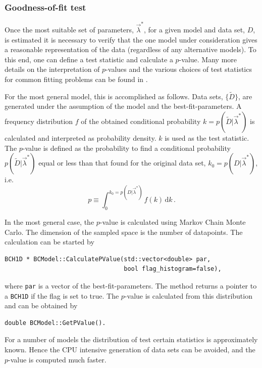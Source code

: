 \documentclass[11pt, a4paper]{article}
\begin{document}
\subsubsection{Goodness-of-fit test}

Once the most suitable set of parameters, $\vec{\lambda}^{*}$, for a
given model and data set, $D$, is estimated it is necessary
to verify that the one  model under consideration
gives a reasonable representation of the data
(regardless of any alternative models). To this end, one can
define a test statistic and calculate a $p$-value. Many more
details on the interpretation of $p$-values and the various
choices of test statistics for common fitting problems can be found
in \cite{BAT_pValue}.

For the most general model, this is accomplished as follows.
Data sets, $\{ \tilde{D} \}$, are generated under the
assumption of the model and the best-fit-parameters. A frequency
distribution $f$ of the obtained conditional probability
$k=p(\tilde{D}|\vec{\lambda}^{*})$ is calculated and interpreted as
probability density. $k$ is used as the test statistic.
The $p$-value is defined as the probability to
find a conditional probability $p(\tilde{D}|\vec{\lambda}^{*})$ equal
or less than that found for the original data set,
$k_{0}=p(D|\vec{\lambda}^{*})$, i.e.
%
\begin{equation}
p \equiv  \int_{0}^{k_{0}=p(D|\vec{\lambda}^{*})} f(k) \, \mathrm{d}k \, .
\end{equation}

In the most general case, the $p$-value is calculated using Markov
Chain Monte Carlo. The dimension of the sampled space is the number
of datapoints.
 The calculation can be started by
%
\begin{verbatim}
BCH1D * BCModel::CalculatePValue(std::vector<double> par,
                                 bool flag_histogram=false),
\end{verbatim}
%
where \verb|par| is a vector of the best-fit-parameters. The method
returns a pointer to a \verb|BCH1D| if the flag is set to true. The
$p$-value is calculated from this distribution and can be obtained by
%
\begin{verbatim}
double BCModel::GetPValue().
\end{verbatim}

For a number of models the distribution of test certain statistics is
approximately known. Hence the CPU intensive generation of data sets
can be avoided, and the $p$-value is computed much faster.
\end{document}
